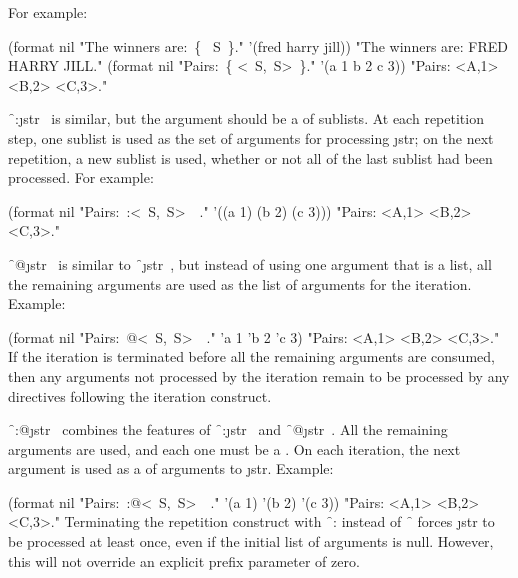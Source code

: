 For example:
                                                                       
\code
 (format nil "The winners are:~\{ ~S~\}." 
         '(fred harry jill)) 
\EV "The winners are: FRED HARRY JILL."                           
 (format nil "Pairs:~\{ <~S,~S>~\}." 
         '(a 1 b 2 c 3))
\EV "Pairs: <A,1> <B,2> <C,3>."
\endcode

\f{~:\lbr \j{str}~\rbr  } is similar, 
but the argument should be a  of sublists.
At each repetition step, one sublist 
is used as the set of arguments for
processing \j{str}; on the next repetition, a new sublist 
is used, whether
or not all of the last sublist had been processed.  
For example:

                                                                               

\code
 (format nil "Pairs:~:\lbr <~S,~S>~\rbr\ ." 
                 '((a 1) (b 2) (c 3)))
\EV "Pairs: <A,1> <B,2> <C,3>."
\endcode

\f{~@\lbr \j{str}~\rbr }
is similar to \f{~\lbr \j{str}~\rbr  }, but instead of
using one argument that is a list, all the remaining arguments
are used as the list of arguments for the iteration.
Example:
                                    
\code
 (format nil "Pairs:~@\lbr <~S,~S>~\rbr\ ." 'a 1 'b 2 'c 3)
\EV "Pairs: <A,1> <B,2> <C,3>."
\endcode
If the iteration is terminated before all the remaining arguments are
consumed, then any arguments not processed by the iteration remain to be
processed by any directives following the iteration construct.

\f{~:@\lbr \j{str}~\rbr  } 
combines the features                              
of \f{~:\lbr \j{str}~\rbr  }
and \f{~@\lbr \j{str}~\rbr  }.
All the remaining arguments
are used, and each one must be a .
On each iteration, the next argument is 
used as a  of arguments to \j{str}.
Example:
                                     
\code
 (format nil "Pairs:~:@\lbr <~S,~S>~\rbr\ ." 
              '(a 1) '(b 2) '(c 3)) 
\EV "Pairs: <A,1> <B,2> <C,3>."
\endcode
Terminating the repetition construct with \f{~:\rbr } 
instead of \f{~\rbr  }
forces \j{str} to be processed at least once, even if the initial
list of arguments is null. However, this will not override an explicit
prefix parameter of zero.


